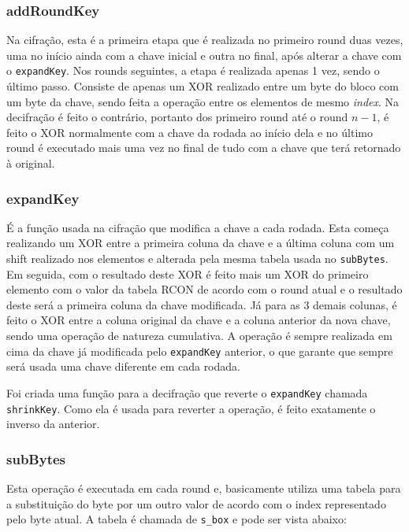 \documentclass[12pt]{article}
\begin{document}
\subsubsection{addRoundKey}
Na cifração, esta é a primeira etapa que é realizada no primeiro round duas vezes, uma no início ainda com a chave inicial e outra no final, após alterar a chave com o \texttt{expandKey}. Nos rounds seguintes, a etapa é realizada apenas 1 vez, sendo o último passo. Consiste de apenas um XOR realizado entre um byte do bloco com um byte da chave, sendo feita a operação entre os elementos de mesmo \textit{index}. Na decifração é feito o contrário, portanto dos primeiro round até o round $n-1$, é feito o XOR normalmente com a chave da rodada ao início dela e no último round é executado mais uma vez no final de tudo com a chave que terá retornado à original.

\subsubsection{expandKey}
É a função usada na cifração que modifica a chave a cada rodada. Esta começa realizando um XOR entre a primeira coluna da chave e a última coluna com um shift realizado nos elementos e alterada pela mesma tabela usada no \texttt{subBytes}. Em seguida, com o resultado deste XOR é feito mais um XOR do primeiro elemento com o valor da tabela RCON de acordo com o round atual e o resultado deste será a primeira coluna da chave modificada. Já para as 3 demais colunas, é feito o XOR entre a coluna original da chave e a coluna anterior da nova chave, sendo uma operação de natureza cumulativa. A operação é sempre realizada em cima da chave já modificada pelo \texttt{expandKey} anterior, o que garante que sempre será usada uma chave diferente em cada rodada.

Foi criada uma função para a decifração que reverte o \texttt{expandKey} chamada \texttt{shrinkKey}. Como ela é usada para reverter a operação, é feito exatamente o inverso da anterior.

\subsubsection{subBytes}
Esta operação é executada em cada round e, basicamente utiliza uma tabela para a substituição do byte por um outro valor de acordo com o index representado pelo byte atual. A tabela é chamada de \texttt{s\_box} e pode ser vista abaixo:
\end{document}
